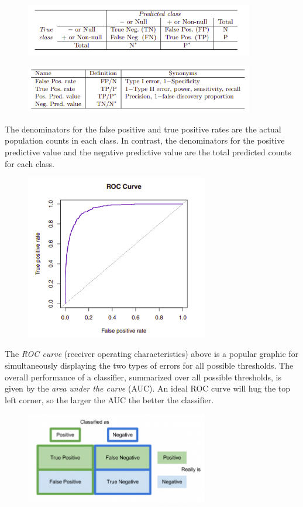 \documentclass{article}
\numberwithin{equation}{section}
\begin{document}
\begin{enumerate}
\begin{figure}[H]
    \centering
    \includegraphics[width=10cm]{classifier-names.png}
\end{figure}
\begin{figure}[H]
    \centering
\includegraphics[width=10cm]{classifier-measures.png}
\end{figure}
The denominators for the false positive and true positive rates
are the actual population counts in each class. In contrast, the denominators for the positive predictive value and the negative predictive value are the total predicted counts for each class.
\begin{figure}[H]
    \centering
    \includegraphics[width=8cm]{roc-curve.png}
\end{figure}
The \textit{ROC curve} (receiver operating characteristics) above is a popular graphic for simultaneously displaying the two types of errors for all possible thresholds. The overall performance of a classifier, summarized over all possible thresholds, is given by the \textit{area under the curve} (AUC). An ideal ROC curve will hug the top left corner, so the larger the AUC the better the classifier.

\begin{figure}[H]
    \centering
    \includegraphics[width=8cm]{confusion-matrix.png}
\end{figure}


\end{enumerate}
\end{document}
